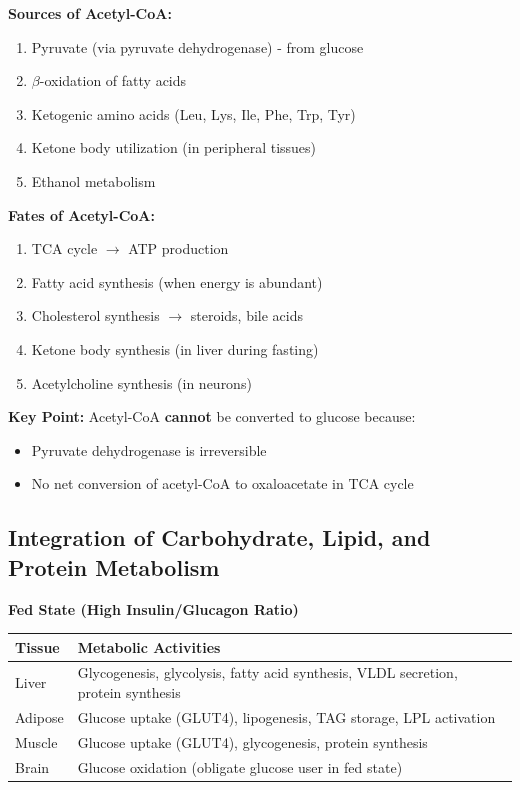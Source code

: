 \begin{tcolorbox}[colback=blue!5, colframe=blue!70!black, title=\textbf{Acetyl-CoA: The Metabolic Crossroads}]
\textbf{Sources of Acetyl-CoA:}
\begin{enumerate}
    \item Pyruvate (via pyruvate dehydrogenase) - from glucose
    \item $\beta$-oxidation of fatty acids
    \item Ketogenic amino acids (Leu, Lys, Ile, Phe, Trp, Tyr)
    \item Ketone body utilization (in peripheral tissues)
    \item Ethanol metabolism
\end{enumerate}

\textbf{Fates of Acetyl-CoA:}
\begin{enumerate}
    \item TCA cycle $\rightarrow$ ATP production
    \item Fatty acid synthesis (when energy is abundant)
    \item Cholesterol synthesis $\rightarrow$ steroids, bile acids
    \item Ketone body synthesis (in liver during fasting)
    \item Acetylcholine synthesis (in neurons)
\end{enumerate}

\textbf{Key Point:} Acetyl-CoA \textbf{cannot} be converted to glucose because:
\begin{itemize}
    \item Pyruvate dehydrogenase is irreversible
    \item No net conversion of acetyl-CoA to oxaloacetate in TCA cycle
\end{itemize}
\end{tcolorbox}

\subsection{Integration of Carbohydrate, Lipid, and Protein Metabolism}

\begin{center}
\textbf{Fed State (High Insulin/Glucagon Ratio)}
\end{center}

\begin{tabular}{p{4cm}p{10cm}}
\toprule
\textbf{Tissue} & \textbf{Metabolic Activities} \\
\midrule
Liver & Glycogenesis, glycolysis, fatty acid synthesis, VLDL secretion, protein synthesis \\
Adipose & Glucose uptake (GLUT4), lipogenesis, TAG storage, LPL activation \\
Muscle & Glucose uptake (GLUT4), glycogenesis, protein synthesis \\
Brain & Glucose oxidation (obligate glucose user in fed state) \\
\bottomrule
\end{tabular}

